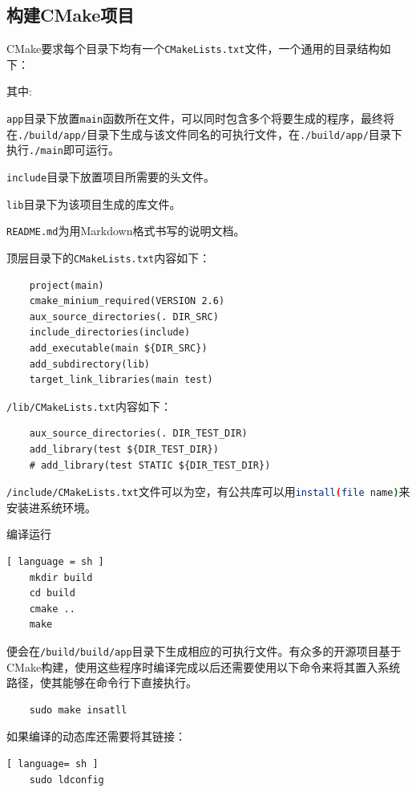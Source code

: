 		\subsection{构建CMake项目}
			\par CMake要求每个目录下均有一个\lstinline{CMakeLists.txt}文件，一个通用的目录结构如下：
			\par\noindent 其中:
			\par\noindent \lstinline{app}目录下放置\lstinline{main}函数所在文件，可以同时包含多个将要生成的程序，最终将在\lstinline{./build/app/}目录下生成与该文件同名的可执行文件，在\lstinline{./build/app/}目录下执行\lstinline{./main}即可运行。
			\par\noindent \lstinline{include}目录下放置项目所需要的头文件。
			\par\noindent \lstinline{lib}目录下为该项目生成的库文件。
			\par\noindent \lstinline{README.md}为用Markdown格式书写的说明文档。
			\par\noindent 顶层目录下的\lstinline{CMakeLists.txt}内容如下：
			\begin{lstlisting}
	project(main)
	cmake_minium_required(VERSION 2.6)
	aux_source_directories(. DIR_SRC)
	include_directories(include)
	add_executable(main ${DIR_SRC})
	add_subdirectory(lib)
	target_link_libraries(main test)
			\end{lstlisting}
			\par\noindent \lstinline{/lib/CMakeLists.txt}内容如下：
			\begin{lstlisting}
	aux_source_directories(. DIR_TEST_DIR)
	add_library(test ${DIR_TEST_DIR})
	# add_library(test STATIC ${DIR_TEST_DIR})
			\end{lstlisting}
			\par\noindent \lstinline{/include/CMakeLists.txt}文件可以为空，有公共库可以用\lstinline[language=sh]{install(file name)}来安装进系统环境。
			\par\noindent 编译运行
			\begin{lstlisting}[ language = sh ]
	mkdir build
	cd build
	cmake ..
	make
			\end{lstlisting}
			\par\noindent 便会在\lstinline{/build/build/app}目录下生成相应的可执行文件。有众多的开源项目基于CMake构建，使用这些程序时编译完成以后还需要使用以下命令来将其置入系统路径，使其能够在命令行下直接执行。
			\begin{lstlisting}
	sudo make insatll
			\end{lstlisting}
			\par\noindent 如果编译的动态库还需要将其链接：
			\begin{lstlisting}[ language= sh ]
	sudo ldconfig
			\end{lstlisting}
